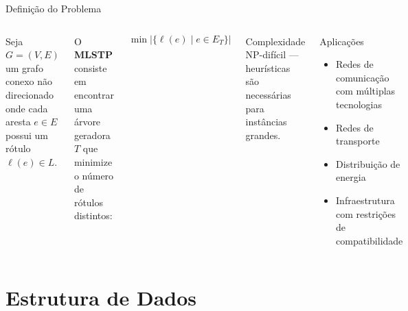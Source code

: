 \documentclass{beamer}
\begin{document}
\begin{frame}{Definição do Problema}

\begin{columns}[T]

    Seja $G = (V, E)$ um grafo conexo não direcionado onde cada aresta $e \in E$ possui um rótulo $\ell(e) \in L$.

    \vspace{0.4cm}

    O \textbf{MLSTP} consiste em encontrar uma árvore geradora $T$ que minimize o número de rótulos distintos:

    \[
        \min \left|\{\ell(e) \mid e \in E_T\}\right|
    \]

    \begin{alertblock}{Complexidade}
        NP-difícil — heurísticas são necessárias para instâncias grandes.
    \end{alertblock}

    \begin{block}{Aplicações}
        \begin{itemize}
            \item Redes de comunicação com múltiplas tecnologias
            \item Redes de transporte
            \item Distribuição de energia
            \item Infraestrutura com restrições de compatibilidade
        \end{itemize}
    \end{block}

\end{columns}

\end{frame}

\section{Estrutura de Dados}
\end{document}
